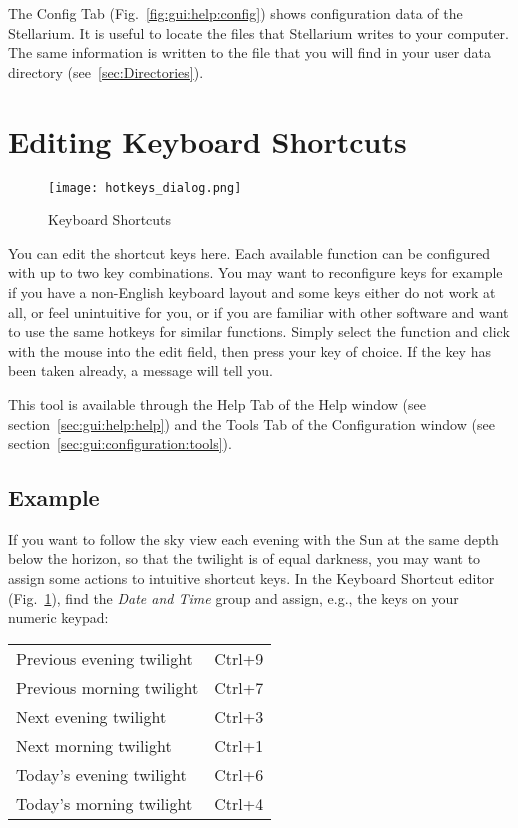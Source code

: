 The Config Tab (Fig.~\ref{fig:gui:help:config}) shows configuration data of the Stellarium. It is useful to locate the files that Stellarium writes
to your computer. The same information is written to  the file  that you will
find in your user data directory (see~\ref{sec:Directories}).

\clearpage
\section{Editing Keyboard Shortcuts}
\label{sec:gui:help:hotkeys}

\begin{figure}[htbp]
\centering\texttt{[image: hotkeys\_dialog.png]}
\caption{Keyboard Shortcuts}
\label{fig:gui:hotkeys}
\end{figure}

You can edit the shortcut keys here. Each available function can be
configured with up to two key combinations. You may want to
reconfigure keys for example if you have a non-English keyboard layout
and some keys either do not work at all, or feel unintuitive for you,
or if you are familiar with other software and want to use the same
hotkeys for similar functions. Simply select the function and click
with the mouse into the edit field, then press your key of choice. If
the key has been taken already, a message will tell you.

This tool is available through the Help Tab of the Help window (see section~\ref{sec:gui:help:help}) and the
Tools Tab of the Configuration window (see section~\ref{sec:gui:configuration:tools}).

\subsection{Example}
\label{sec:gui:help:hotkeys:example}

If you want  to follow the sky view each evening
with the Sun at the same depth below the horizon, so that the twilight
is of equal darkness, you may want to assign some actions to intuitive
shortcut keys. In the Keyboard Shortcut editor
(Fig.~\ref{fig:gui:hotkeys}), find the \emph{Date and Time} group and
assign, e.g., the keys on your numeric keypad:

\begin{tabular}{ll}
  Previous evening twilight & Ctrl+9 \\
  Previous morning twilight & Ctrl+7 \\
  Next evening twilight     & Ctrl+3 \\
  Next morning twilight     & Ctrl+1 \\
  Today's evening twilight  & Ctrl+6 \\
  Today's morning twilight  & Ctrl+4 \\
\end{tabular}









